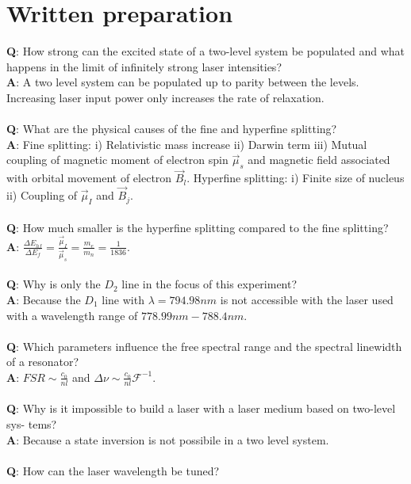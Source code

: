 \chapter{Written preparation}

\textbf{Q}: How strong can the excited state of a two-level system be populated and what happens in the limit of infinitely strong laser intensities? \\
\textbf{A}: A two level system can be populated up to parity between the levels. Increasing laser input power only increases the rate of relaxation.\\
\\
\noindent
\textbf{Q}: What are the physical causes of the fine and hyperfine splitting? \\
\textbf{A}: Fine splitting: i) Relativistic mass increase ii) Darwin term iii) Mutual coupling of magnetic moment of electron spin $\vec{\mu}_{s}$ and magnetic field associated with orbital movement of electron $\vec{B}_{l}$. Hyperfine splitting: i) Finite size of nucleus ii) Coupling of $\vec{\mu}_{I}$ and $\vec{B}_{j}$.\\
\\
\noindent
\textbf{Q}: How much smaller is the hyperfine splitting compared to the fine splitting? \\
\textbf{A}: $\frac{\Delta E_{hf}}{\Delta E_{f}}=\frac{\vec{\mu}_{I}}{\vec{\mu}_{s}}=\frac{m_{e}}{m_{n}}=\frac{1}{1836}$.\\
\\
\noindent
\textbf{Q}: Why is only the $D_{2}$ line in the focus of this experiment? \\
\textbf{A}: Because the $D_{1}$ line with $\lambda=794.98nm$ is not accessible with the laser used with a wavelength range of $778.99nm-788.4nm$.\\
\\
\noindent
\textbf{Q}: Which parameters influence the free spectral range and the spectral linewidth of a resonator? \\
\textbf{A}: $FSR\sim\frac{c_{0}}{nl}$ and $\Delta\nu\sim\frac{c_{0}}{nl}\mathcal{F}^{-1}$.\\
\\
\noindent
\textbf{Q}: Why is it impossible to build a laser with a laser medium based on two-level sys- tems? \\
\textbf{A}: Because a state inversion is not possibile in a two level system.\\
\\
\noindent
\textbf{Q}: How can the laser wavelength be tuned? \\
